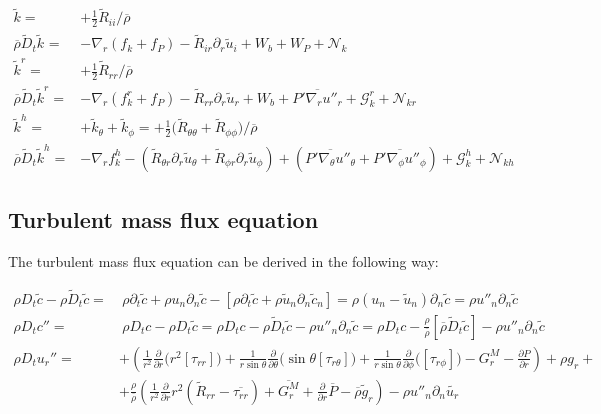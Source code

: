 \documentclass[10pt,paper=a4]{report}
\newcommand{\eht}{\overline}
\newcommand{\fht}{\widetilde}
\newcommand{\dr}{\frac{\partial}{\partial r}}
\newcommand{\fav}{\widetilde}
\newcommand{\av}{\overline}
\begin{document}
\begin{align}
\fht{k} = & +\frac{1}{2}\fht{R}_{ii} / \eht{\rho}  \\
\av{\rho} \fav{D}_t \fav{k}^{ } = & -\nabla_r ( f_k +  f_P ) - \fht{R}_{ir}\partial_r \fht{u}_i + W_b + W_P + {\mathcal N_k}  \label{eq:rans_tke} \\
\fht{k}^r = & +\frac{1}{2}\fht{R}_{rr} / \eht{\rho}  \\
\av{\rho} \fav{D}_t \fav{k}^r =  &  -\nabla_r  ( f_k^r + f_P )  - \fht{R}_{rr}\partial_r \fht{u}_r + W_b  + \eht{P'\nabla_r u''_r} + {\mathcal G_k^r} + {\mathcal N_{kr}} \label{eq:rans_ekin_r} \\
\fht{k}^h = & +\fht{k}_\theta + \fht{k}_\phi = +\frac{1}{2} \big( \fht{R}_{\theta \theta} + \fht{R}_{\phi \phi} \big) / \eht{\rho} \\
\av{\rho} \fav{D}_t \fav{k}^h =  &  -\nabla_r f_k^h - (\fht{R}_{\theta r}\partial_r \fht{u}_\theta + \fht{R}_{\phi r}\partial_r \fht{u}_\phi) + (\eht{P' \nabla_\theta u''_\theta} + \eht{P' \nabla_\phi u''_\phi}) + {\mathcal G_k^h} + {\mathcal N_{kh}} \label{eq:rans_ekin_h} 
\end{align}

\subsection{Turbulent mass flux equation}

The turbulent mass flux equation can be derived in the following way:

\fontsize{10pt}{20pt}

\begin{align}
\rho D_t \fht{c} - \rho \fht{D}_t \fht{c} = & \ \rho \partial_t \fht{c} + \rho u_n \partial_n \fht{c} - [\rho \partial_t \fht{c} + \rho \fht{u}_n \partial_n \fht{c}_n] = \rho (u_n - \fht{u}_n)\partial_n \fht{c} =  \rho u''_n \partial_n \fht{c} \\
\rho D_t c'' =  & \ \rho D_t c - \rho D_t \fht{c} = \rho D_t c -  \rho \fht{D}_t \fht{c} - \rho u''_n \partial_n \fht{c} = \rho D_t c -  \frac{\rho}{\eht{\rho}} [\eht{\rho}\fht{D}_t \fht{c}] - \rho u''_n \partial_n \fht{c} \\
\rho D_t u_r'' =  & +\left( \frac{1}{r^{2}} \frac{\partial}{\partial r} \big( r^{2} [\tau_{rr}]\big) + \frac{1}{r\sin{\theta}}\frac{\partial}{\partial \theta}(\sin{\theta}[\tau_{r\theta}]\big) + \frac{1}{r\sin{\theta}}\frac{\partial}{\partial \phi}\big([\tau_{r\phi}]\big) - G_r^M - \frac{\partial P}{\partial r} \right) + \rho g_r + \\ 
 & + \frac{\rho}{\eht{\rho}}\left( \frac{1}{r^2}\dr r^2 (\fht{R}_{rr}-\eht{\tau_{rr}}) + \eht{G_r^M} + \dr \eht{P} - \eht{\rho}\fht{g}_r \right) - \rho u''_n \partial_n \fht{u_r}  & \
\end{align}
\end{document}
